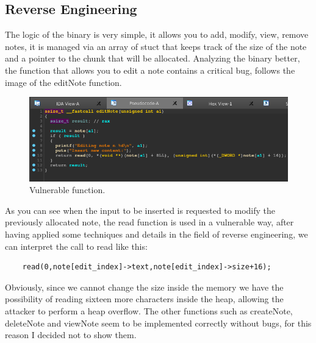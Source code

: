     \subsection{Reverse Engineering}
    The logic of the binary is very simple, it allows you to add, modify, view, remove notes, it is managed via an array of stuct that keeps track of the size of the note and a pointer to the chunk that will be allocated.\newline
     Analyzing the binary better, the function that allows you to edit a note contains a critical bug, follows the image of the editNote function.\newline
     \begin{figure}[htbp]
         \centering
         \includegraphics[width=1\linewidth]{Images/heap_chall_bug.png}
         \caption{Vulnerable function.}
         \label{fig:enter-label}
     \end{figure}

    As you can see when the input to be inserted is requested to modify the previously allocated note, the read function is used in a vulnerable way, after having applied some techniques and details in the field of reverse engineering, we can interpret the call to read like this:
    \begin{verbatim}
    read(0,note[edit_index]->text,note[edit_index]->size+16);
    \end{verbatim}
    Obviously, since we cannot change the size inside the memory we have the possibility of reading sixteen more characters inside the heap, allowing the attacker to perform a heap overflow.\newline
    The other functions such as createNote, deleteNote and viewNote seem to be implemented correctly without bugs, for this reason I decided not to show them.
